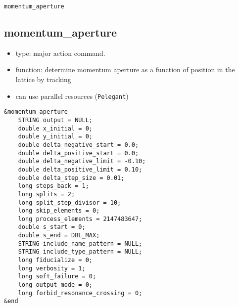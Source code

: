 \documentclass[11pt]{article}
\begin{document}
\newpage
\begin{center}{\Large\verb|momentum_aperture|}\end{center}
\subsection{momentum\_aperture \label{subsec:momentumaperture}}

\begin{itemize}
\item type: major action command.
\item function: determine momentum aperture as a function of position in the lattice by tracking
\item can use parallel resources (\verb|Pelegant|)
\end{itemize}

\begin{verbatim}
&momentum_aperture
    STRING output = NULL;
    double x_initial = 0;
    double y_initial = 0;
    double delta_negative_start = 0.0;
    double delta_positive_start = 0.0;
    double delta_negative_limit = -0.10;
    double delta_positive_limit = 0.10;
    double delta_step_size = 0.01;
    long steps_back = 1;
    long splits = 2;
    long split_step_divisor = 10;
    long skip_elements = 0;
    long process_elements = 2147483647;
    double s_start = 0;
    double s_end = DBL_MAX;
    STRING include_name_pattern = NULL;
    STRING include_type_pattern = NULL;
    long fiducialize = 0;
    long verbosity = 1;
    long soft_failure = 0;
    long output_mode = 0;
    long forbid_resonance_crossing = 0;
&end
\end{verbatim}
\end{document}
